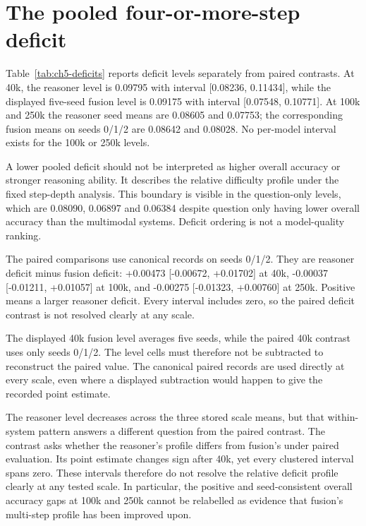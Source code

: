 \section{The pooled four-or-more-step deficit}
\label{sec:ch5-deficit}
Table~\ref{tab:ch5-deficits} reports deficit levels separately from paired
contrasts. At 40k, the reasoner level is 0.09795 with interval [0.08236,
0.11434], while the displayed five-seed fusion level is 0.09175 with interval
[0.07548, 0.10771]. At 100k and 250k the reasoner seed means are 0.08605 and
0.07753; the corresponding fusion means on seeds 0/1/2 are 0.08642 and
0.08028. No per-model interval exists for the 100k or 250k levels.

A lower pooled deficit should not be interpreted as higher overall accuracy or
stronger reasoning ability. It describes the relative difficulty profile under
the fixed step-depth analysis. This boundary is visible in the question-only
levels, which are 0.08090, 0.06897 and 0.06384 despite question only having
lower overall accuracy than the multimodal systems. Deficit ordering is not a
model-quality ranking.

The paired comparisons use canonical records on seeds 0/1/2. They are
reasoner deficit minus fusion deficit: +0.00473 [-0.00672, +0.01702] at 40k,
-0.00037 [-0.01211, +0.01057] at 100k, and -0.00275 [-0.01323, +0.00760]
at 250k. Positive means a larger reasoner deficit. Every interval includes
zero, so the paired deficit contrast is not resolved clearly at any scale.

The displayed 40k fusion level averages five seeds, while the paired 40k
contrast uses only seeds 0/1/2. The level cells must therefore not be
subtracted to reconstruct the paired value. The canonical paired records are
used directly at every scale, even where a displayed subtraction would happen
to give the recorded point estimate.

The reasoner level decreases across the three stored scale means, but that
within-system pattern answers a different question from the paired contrast.
The contrast asks whether the reasoner's profile differs from fusion's under
paired evaluation. Its point estimate changes sign after 40k, yet every
clustered interval spans zero. These intervals therefore do not resolve the
relative deficit profile clearly at any tested scale. In particular, the
positive and seed-consistent overall accuracy gaps at 100k and 250k cannot be
relabelled as evidence that fusion's multi-step profile has been improved upon.

